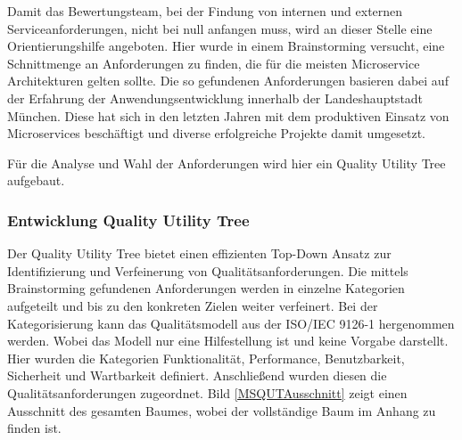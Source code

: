 Damit das Bewertungsteam, bei der Findung von internen und externen Serviceanforderungen, nicht bei null anfangen muss, wird an dieser Stelle eine Orientierungshilfe angeboten. Hier wurde in einem Brainstorming versucht, eine Schnittmenge an Anforderungen zu finden, die für die meisten Microservice Architekturen gelten sollte. 
Die so gefundenen Anforderungen basieren dabei auf der Erfahrung der Anwendungsentwicklung innerhalb der Landeshauptstadt München. Diese hat sich in den letzten Jahren mit dem produktiven Einsatz von Microservices beschäftigt und diverse erfolgreiche Projekte damit umgesetzt.   

Für die Analyse und Wahl der Anforderungen wird hier ein Quality Utility Tree aufgebaut.

\subsubsection{Entwicklung Quality Utility Tree}

Der Quality Utility Tree bietet einen effizienten Top-Down Ansatz zur Identifizierung und Verfeinerung von Qualitätsanforderungen. Die mittels Brainstorming gefundenen Anforderungen werden in einzelne Kategorien aufgeteilt und bis zu den konkreten Zielen weiter verfeinert. Bei der Kategorisierung kann das Qualitätsmodell aus der ISO/IEC 9126-1 hergenommen werden. Wobei das Modell nur eine Hilfestellung ist und keine Vorgabe darstellt. Hier wurden die Kategorien Funktionalität, Performance, Benutzbarkeit, Sicherheit und Wartbarkeit definiert. Anschließend wurden diesen die Qualitätsanforderungen zugeordnet. Bild \ref{MSQUTAusschnitt} zeigt einen Ausschnitt des gesamten Baumes, wobei der vollständige Baum im Anhang zu finden ist. 

%
%	

